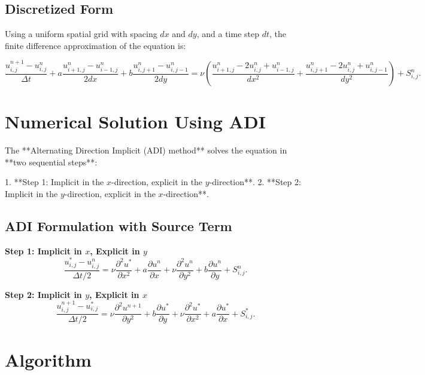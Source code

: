 \documentclass{article}
\begin{document}
\subsection{Discretized Form}
Using a uniform spatial grid with spacing \( dx \) and \( dy \), and a time step \( dt \), the finite difference approximation of the equation is:

\begin{equation}
    \frac{u_{i,j}^{n+1} - u_{i,j}^{n}}{\Delta t} + a \frac{u_{i+1,j}^{n} - u_{i-1,j}^{n}}{2dx} + b \frac{u_{i,j+1}^{n} - u_{i,j-1}^{n}}{2dy} = \nu \left( \frac{u_{i+1,j}^{n} - 2u_{i,j}^{n} + u_{i-1,j}^{n}}{dx^2} + \frac{u_{i,j+1}^{n} - 2u_{i,j}^{n} + u_{i,j-1}^{n}}{dy^2} \right) + S_{i,j}^{n}.
\end{equation}

\section{Numerical Solution Using ADI}
The **Alternating Direction Implicit (ADI) method** solves the equation in **two sequential steps**:

1. **Step 1: Implicit in the \( x \)-direction, explicit in the \( y \)-direction**.
2. **Step 2: Implicit in the \( y \)-direction, explicit in the \( x \)-direction**.

\subsection{ADI Formulation with Source Term}
\textbf{Step 1: Implicit in \( x \), Explicit in \( y \)}
\begin{equation}
    \frac{u_{i,j}^{*} - u_{i,j}^{n}}{\Delta t/2} = \nu \frac{\partial^2 u^{*}}{\partial x^2} + a \frac{\partial u^{n}}{\partial x} + \nu \frac{\partial^2 u^{n}}{\partial y^2} + b \frac{\partial u^{n}}{\partial y} + S_{i,j}^{n}.
\end{equation}

\textbf{Step 2: Implicit in \( y \), Explicit in \( x \)}
\begin{equation}
    \frac{u_{i,j}^{n+1} - u_{i,j}^{*}}{\Delta t/2} = \nu \frac{\partial^2 u^{n+1}}{\partial y^2} + b \frac{\partial u^{*}}{\partial y} + \nu \frac{\partial^2 u^{*}}{\partial x^2} + a \frac{\partial u^{*}}{\partial x} + S_{i,j}^{*}.
\end{equation}

\section{Algorithm}
\end{document}
